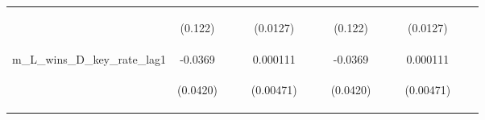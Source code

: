 \documentclass[]{article}
\begin{document}
\begin{center}
\begin{tabular}{lcccccccccccc}
\vspace{4pt} & \begin{footnotesize}(0.122)\end{footnotesize} & \begin{footnotesize}\end{footnotesize} & \begin{footnotesize}\end{footnotesize} & \begin{footnotesize}(0.0127)\end{footnotesize} & \begin{footnotesize}\end{footnotesize} & \begin{footnotesize}\end{footnotesize} & \begin{footnotesize}(0.122)\end{footnotesize} & \begin{footnotesize}\end{footnotesize} & \begin{footnotesize}\end{footnotesize} & \begin{footnotesize}(0.0127)\end{footnotesize} & \begin{footnotesize}\end{footnotesize} & \begin{footnotesize}\end{footnotesize} \\
m\_L\_wins\_D\_key\_rate\_lag1 & -0.0369 &  &  & 0.000111 &  &  & -0.0369 &  &  & 0.000111 &  &  \\
\vspace{4pt} & \begin{footnotesize}(0.0420)\end{footnotesize} & \begin{footnotesize}\end{footnotesize} & \begin{footnotesize}\end{footnotesize} & \begin{footnotesize}(0.00471)\end{footnotesize} & \begin{footnotesize}\end{footnotesize} & \begin{footnotesize}\end{footnotesize} & \begin{footnotesize}(0.0420)\end{footnotesize} & \begin{footnotesize}\end{footnotesize} & \begin{footnotesize}\end{footnotesize} & \begin{footnotesize}(0.00471)\end{footnotesize} & \begin{footnotesize}\end{footnotesize} & \begin{footnotesize}\end{footnotesize} \\

\end{tabular}
\end{center}
\end{document}
